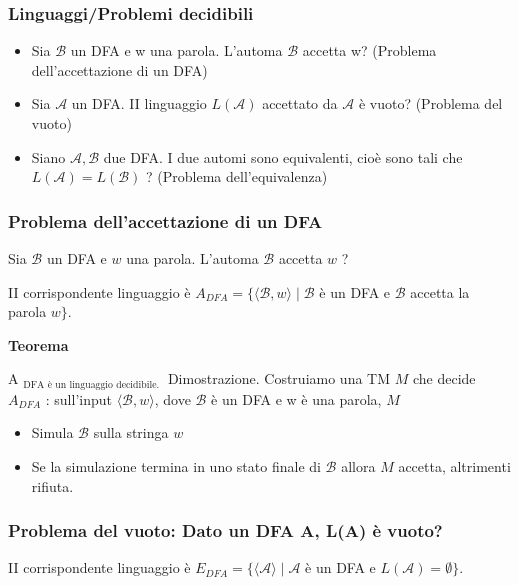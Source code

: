 \subsubsection{Linguaggi/Problemi decidibili}

\begin{itemize}
    \item Sia $\mathcal{B}$ un DFA e w una parola. L'automa $\mathcal{B}$ accetta w? (Problema dell'accettazione di un DFA)
    \item Sia $\mathcal{A}$ un DFA. II linguaggio $L(\mathcal{A})$ accettato da $\mathcal{A}$ è vuoto? (Problema del vuoto)
    \item Siano $\mathcal{A}, \mathcal{B}$ due DFA. I due automi sono equivalenti, cioè sono tali che $L(\mathcal{A})=L(\mathcal{B})$ ? (Problema dell'equivalenza)
\end{itemize}

\subsubsection{Problema dell'accettazione di un DFA}

Sia $\mathcal{B}$ un DFA e $w$ una parola. L'automa $\mathcal{B}$ accetta $w$ ?

II corrispondente linguaggio è
$A_{D F A}=\{\langle\mathcal{B}, w\rangle \mid \mathcal{B}$ è un DFA e $\mathcal{B}$ accetta la parola $w\} .$

\vspace{5mm}

\textbf{Teorema}

A $_{\text {DFA è un linguaggio decidibile. }}$
Dimostrazione.
Costruiamo una TM $M$ che decide $A_{D F A}$ : sull'input $\langle\mathcal{B}, w\rangle$, dove $\mathcal{B}$ è un DFA e w è una parola, $M$
\begin{itemize}
    \item Simula $\mathcal{B}$ sulla stringa $w$
    \item Se la simulazione termina in uno stato finale di $\mathcal{B}$ allora $M$ accetta, altrimenti rifiuta.
\end{itemize}

\subsubsection{Problema del vuoto: Dato un DFA A, L(A) è vuoto?}

II corrispondente linguaggio è $E_{D F A}=\{\langle\mathcal{A}\rangle \mid \mathcal{A}$ è un DFA e $L(\mathcal{A})=\emptyset\} .$

